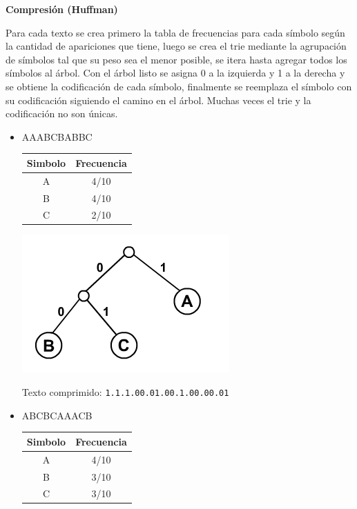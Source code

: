 \documentclass[dcc,sol]{fcfmcourse}
\begin{document}
\begin{problems}
\begin{enumerate}[1.]
\end{enumerate}

\newpage
\problem \textbf{Compresión (Huffman)}

Para cada texto se crea primero la tabla de frecuencias para cada símbolo según la cantidad de apariciones que tiene, luego se crea el trie mediante la agrupación de símbolos tal que su peso sea el menor posible, se itera hasta agregar todos los símbolos al árbol. Con el árbol listo se asigna 0 a la izquierda y 1 a la derecha y se obtiene la codificación de cada símbolo, finalmente se reemplaza el símbolo con su codificación siguiendo el camino en el árbol. Muchas veces el trie y la codificación no son únicas.

\begin{itemize}
\item AAABCBABBC \\

\begin{multicols}{2}
\begin{tabular}{|c|c|} \hline
Simbolo & Frecuencia  \\ \hline
A & 4/10 \\
B & 4/10 \\
C & 2/10 \\ \hline
\end{tabular}

\includegraphics[scale=0.5]{trie1.png}
\end{multicols}

Texto comprimido: \texttt{1.1.1.00.01.00.1.00.00.01} \\

\item ABCBCAAACB \\

\begin{multicols}{2}
\begin{tabular}{|c|c|} \hline
Simbolo & Frecuencia  \\ \hline
A & 4/10 \\
B & 3/10 \\
C & 3/10 \\ \hline
\end{tabular}


\end{multicols}
\end{itemize}
\end{problems}
\end{document}

